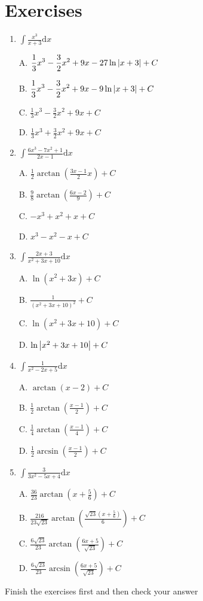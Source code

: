 \documentclass{article}
\numberwithin{equation}{section}
\begin{document}
\section{Exercises}
\begin{enumerate}
    \item $\displaystyle \int \frac{x^3}{x+3}\mathrm{d}x$

    A. $\displaystyle \frac{1}{3}x^3 - \frac{3}{2}x^2 + 9x - 27\ln\abs{x+3}+C$
    
    B. $\displaystyle \frac{1}{3}x^3 - \frac{3}{2}x^2 + 9x - 9\ln\abs{x+3} + C$
    
    C. $\displaystyle \frac{1}{3}x^3 - \frac{3}{2}x^2 + 9x +C$

    D. $\displaystyle \frac{1}{3}x^3 + \frac{3}{2} x^2 + 9x +C$
    \item $\displaystyle \int \frac{6x^3-7x^2+1}{2x-1}\mathrm{d}x$
    
    A. $\displaystyle \frac{1}{2} \arctan \left(\frac{3x-1}{2}x\right) + C$

    B. $\displaystyle \frac{9}{8} \arctan \left(\frac{6x-2}{9}\right) +C$

    C. $\displaystyle -x^3 + x^2 +x +C$

    D. $\displaystyle x^3 - x^2 - x + C$

    \item $\displaystyle \int \frac{2x+3}{x^2 + 3x + 10}\mathrm{d}x$
    
    A. $\ln \left(x^2+3x\right)+C$

    B. $\displaystyle \frac{1}{(x^2+3x+10)^2} +C$

    C. $\ln \left(x^2+3x+10\right)+C$

    D. $\ln \abs{x^2+3x+10}+C$
 
    \item $\displaystyle \int \frac{1}{x^2-2x+5}\mathrm{d}x$
    
    A. $\displaystyle \arctan (x-2)+C$

    B. $\displaystyle \frac{1}{2}\arctan \left(\frac{x-1}{2}\right) +C$

    C. $\displaystyle \frac{1}{4}\arctan\left(\frac{x-1}{4}\right) +C$

    D. $\displaystyle \frac{1}{2}\arcsin \left(\frac{x-1}{2}\right) +C$

    \item $\displaystyle \int \frac{3}{3x^2-5x+4}\mathrm{d}x$

    A. $\displaystyle \frac{36}{23} \arctan (x+\frac{5}{6}) +C$

    B. $\displaystyle \frac{216}{23\sqrt{23}}\arctan \left(\frac{\sqrt{23}\left(x+\frac{5}{6}\right)}{6}\right) +C$

    C. $\displaystyle \frac{6\sqrt{23}}{23}\arctan \left(\frac{6x+5}{\sqrt{23}}\right) +C$

    D. $\displaystyle \frac{6\sqrt{23}}{23}\arcsin \left(\frac{6x+5}{\sqrt{23}}\right) +C$
\end{enumerate}
Finish the exercises first and then check your answer
\end{document}
